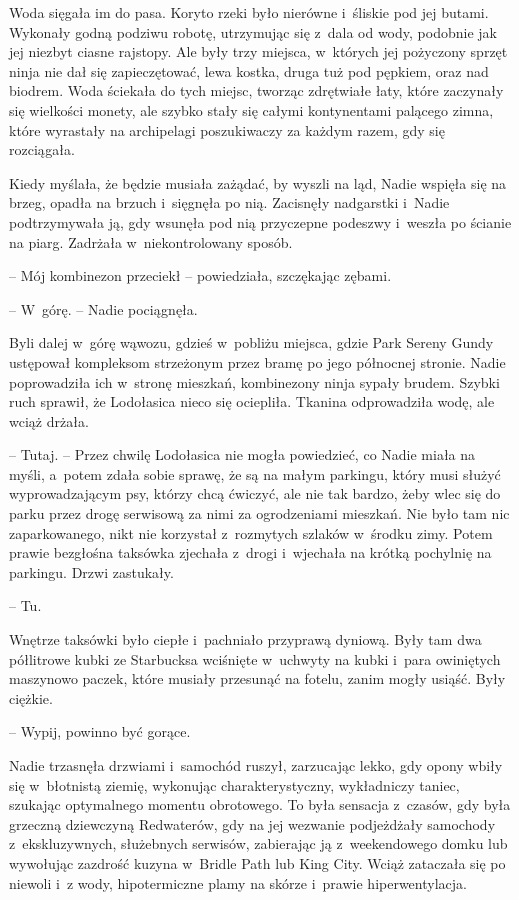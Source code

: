 \documentclass[oneside,polish,11pt,sfheadings]{mwbk}
\begin{document}
Woda sięgała im do pasa. Koryto rzeki było nierówne i~śliskie pod jej
butami. Wykonały godną podziwu robotę, utrzymując się z~dala od wody,
podobnie jak jej niezbyt ciasne rajstopy. Ale były trzy miejsca, w~których jej pożyczony sprzęt ninja nie dał się zapieczętować, lewa
kostka, druga tuż pod pępkiem, oraz nad biodrem. Woda ściekała do tych
miejsc, tworząc zdrętwiałe łaty, które zaczynały się wielkości monety,
ale szybko stały się całymi kontynentami palącego zimna, które wyrastały
na archipelagi poszukiwaczy za każdym razem, gdy się rozciągała.

Kiedy myślała, że będzie musiała zażądać, by wyszli na ląd, Nadie
wspięła się na brzeg, opadła na brzuch i~sięgnęła po nią. Zacisnęły
nadgarstki i~Nadie podtrzymywała ją, gdy wsunęła pod nią przyczepne
podeszwy i~weszła po ścianie na piarg. Zadrżała w~niekontrolowany
sposób.

-- Mój kombinezon przeciekł -- powiedziała, szczękając zębami.

-- W~górę. -- Nadie pociągnęła.

Byli dalej w~górę wąwozu, gdzieś w~pobliżu miejsca, gdzie Park Sereny
Gundy ustępował kompleksom strzeżonym przez bramę po jego północnej
stronie. Nadie poprowadziła ich w~stronę mieszkań, kombinezony ninja
sypały brudem. Szybki ruch sprawił, że Lodołasica nieco się ociepliła.
Tkanina odprowadziła wodę, ale wciąż drżała.

-- Tutaj. -- Przez chwilę Lodołasica nie mogła powiedzieć, co Nadie miała
na myśli, a~potem zdała sobie sprawę, że są na małym parkingu, który
musi służyć wyprowadzającym psy, którzy chcą ćwiczyć, ale nie tak
bardzo, żeby wlec się do parku przez drogę serwisową za nimi za
ogrodzeniami mieszkań. Nie było tam nic zaparkowanego, nikt nie
korzystał z~rozmytych szlaków w~środku zimy. Potem prawie bezgłośna
taksówka zjechała z~drogi i~wjechała na krótką pochylnię na parkingu.
Drzwi zastukały.

-- Tu.

Wnętrze taksówki było ciepłe i~pachniało przyprawą dyniową. Były tam dwa
półlitrowe kubki ze Starbucksa wciśnięte w~uchwyty na kubki i~para
owiniętych maszynowo paczek, które musiały przesunąć na fotelu, zanim
mogły usiąść. Były ciężkie.

-- Wypij, powinno być gorące. 

Nadie trzasnęła drzwiami i~samochód
ruszył, zarzucając lekko, gdy opony wbiły się w~błotnistą ziemię,
wykonując charakterystyczny, wykładniczy taniec, szukając optymalnego
momentu obrotowego. To była sensacja z~czasów, gdy była grzeczną
dziewczyną Redwaterów, gdy na jej wezwanie podjeżdżały samochody z~ekskluzywnych, służebnych serwisów, zabierając ją z~weekendowego domku
lub wywołując zazdrość kuzyna w~Bridle Path lub King City. Wciąż
zataczała się po niewoli i~z wody, hipotermiczne plamy na skórze i~prawie hiperwentylacja.
\end{document}
